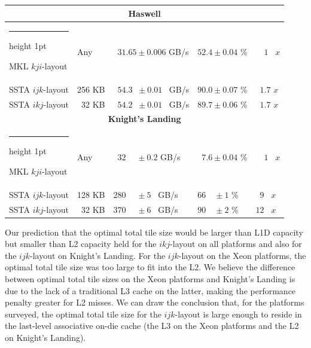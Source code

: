 \documentclass[10pt, conference, compsocconf]{IEEEtran}
\makeatletter
\newcommand{\textapprox}{\texttildelow}
\newcommand{\thickhline}{%
    \noalign {\ifnum 0=`}\fi \hrule height 1pt
    \futurelet \reserved@a \@xhline
}
\makeatother
\begin{document}
\begin{table}[t]
\begin{tabular}{|l|l|l|l|l|}
    \multicolumn{5}{c}{\rule{0pt}{2.25ex} \textbf{Haswell}}           \\ \hline \thickhline
    MKL \(kji\)-layout  &   Any & \, \(31.65 \pm 0.006\) GB/s & \(52.4 \pm 0.04\) \% & \, \, \(1\) \;\, \(x\)        \\ \hline
    SSTA \(ijk\)-layout & 256 KB & \, \(54.3 \; \; \pm 0.01\) \, GB/s & \(90.0 \pm 0.07\) \% & \, \textapprox \(1.7\) \(x\) \\ \hline
    SSTA \(ikj\)-layout & \, 32 KB & \, \(54.2 \; \; \pm 0.01\) \, GB/s & \(89.7 \pm 0.06\) \% & \, \textapprox \(1.7\) \(x\) \\ \hline

    \multicolumn{5}{c}{\rule{0pt}{2.25ex} \textbf{Knight's Landing}}  \\ \hline \thickhline
    MKL \(kji\)-layout  &   Any & \, \(32 \quad \; \pm 0.2\) \quad GB/s &\, \(7.6 \pm 0.04\) \% & \, \, \(1\) \;\, \(x\)               \\ \hline
    SSTA \(ijk\)-layout & 128 KB &  \(280 \quad \; \pm 5\) \; \; \, GB/s &\(66 \; \; \; \, \pm 1\) \; \; \%     & \, \textapprox \(9\) \;\, \(x\)          \\ \hline
    SSTA \(ikj\)-layout & \, 32 KB &  \(370 \quad \; \pm 6\) \; \; \, GB/s &\(90 \; \; \; \, \pm 2\) \; \; \%     & \textapprox \(12\) \;\, \(x\)         \\ \hline
  \end{tabular}
\end{table}

Our prediction that the optimal total tile size would be larger than L1D
  capacity but smaller than L2 capacity held for the \(ikj\)-layout on all
  platforms and also for the \(ijk\)-layout on Knight's Landing.
For the \(ijk\)-layout on the Xeon platforms, the optimal total tile size was
  too large to fit into the L2.
We believe the difference between optimal total tile sizes on the Xeon
  platforms and Knight's Landing is due to the lack of a traditional L3 cache
  on the latter, making the performance penalty greater for L2 misses.
We can draw the conclusion that, for the platforms surveyed, the optimal total
  tile size for the \(ijk\)-layout is large enough to reside in the
  last-level associative on-die cache (the L3 on the Xeon platforms and the L2
  on Knight's Landing).
\end{document}
